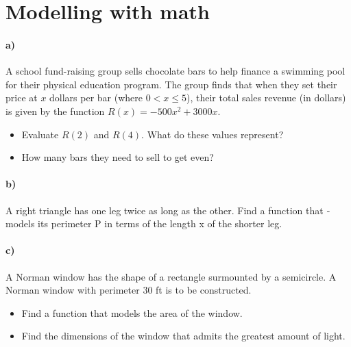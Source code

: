 \documentclass[a4paper]{tufte-handout} %
\begin{document}
\section{Modelling with math}

\paragraph{a)} A school fund-raising group sells chocolate bars to help ﬁnance a swimming pool for their physical education program. 
The group ﬁnds that when they set their price at $x$ dollars per bar (where $0<x\leq5$), their total sales revenue (in dollars) is given by the function $R(x) = -500x^2 + 3000x$.
\begin{itemize}
    \item Evaluate $R(2)$ and $R(4)$. What do these values represent?
    \item How many bars they need to sell to get even?
\end{itemize}

\paragraph{b)}  A right triangle has one leg twice as long as the other. Find a function that
­models its perimeter P in terms of the length x of the shorter leg.

\paragraph{c)} A Norman window has the shape of a rectangle surmounted by a semicircle. 
A Norman window with perimeter 30 ft is to be constructed.
\begin{itemize}
    \item Find a function that models the area of the window.
    \item Find the dimensions of the window that admits the greatest amount of light.
\end{itemize}
\end{document}
